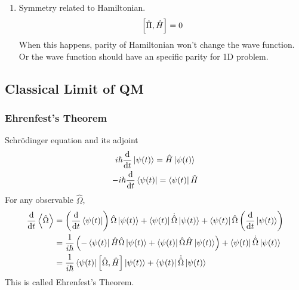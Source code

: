 \documentclass[letterpaper,10pt,english]{sphinxmanual}
\def\d{{\rm d}}
\newcommand{\bra}[1]{\left\langle #1\right|}
\newcommand{\ket}[1]{\left| #1\right\rangle}
\begin{document}
\begin{enumerate}
\begin{enumerate}
\end{enumerate}

\item {} 
Symmetry related to Hamiltonian.
\begin{gather}
\begin{split}\left[ \hat \Pi , \hat H  \right] = 0\end{split}\notag
\end{gather}
When this happens, parity of Hamiltonian won't change the wave function. Or the wave function should have an specific parity for 1D problem.

\end{enumerate}


\subsection{Classical Limit of QM}
\label{Quantum/QuantumMechanics:classical-limit-of-qm}

\subsubsection{Ehrenfest's Theorem}
\label{Quantum/QuantumMechanics:ehrenfest-s-theorem}
Schrödinger equation and its adjoint
\begin{gather}
\begin{split}i\hbar \frac{\d }{\d t} \ket{\psi(t)} = \hat H \ket{\psi(t)}\end{split}\notag\\\begin{split}-i\hbar \frac{\d }{\d t} \bra{\psi(t)} = \bra{\psi(t)} \hat H\end{split}\notag
\end{gather}
For any observable \(\hat \Omega\),
\begin{gather}
\begin{split}\frac{\d }{\d t}\left<\hat \Omega \right > & =  \left( \frac{\d}{\d t}\bra{\psi(t)}\right)  \hat \Omega \ket{\psi(t)} + \bra{\psi(t)} \dot{\hat \Omega} \ket{\psi(t)} + \bra{\psi(t)} \hat \Omega \left( \frac{\d}{\d t}\ket{\psi(t)}\right)  \\
& =  \frac{1}{i\hbar} \left ( - \bra{\psi(t)} \hat H \hat\Omega \ket{\psi(t)} +\bra{\psi(t)} \hat\Omega \hat H \ket{\psi(t)} \right) + \bra{\psi(t)} \dot{\hat \Omega} \ket{\psi(t)} \\
& =  \frac{1}{i\hbar} \bra{\psi(t)}\left[\hat\Omega,\hat H\right] \ket{\psi(t)}+\bra{\psi(t)} \dot{\hat \Omega} \ket{\psi(t)}\end{split}\notag
\end{gather}
This is called Ehrenfest's Theorem.
\end{document}
